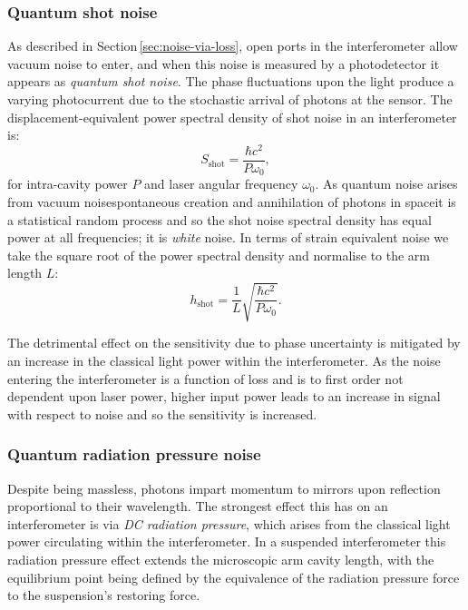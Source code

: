 \subsubsection{\label{sec:quantum-shot-noise}Quantum shot noise}
As described in Section\,\ref{sec:noise-via-loss}, open ports in the interferometer allow vacuum noise to enter, and when this noise is measured by a photodetector it appears as \emph{quantum shot noise}. The phase fluctuations upon the light produce a varying photocurrent due to the stochastic arrival of photons at the sensor. The displacement-equivalent power spectral density of shot noise in an interferometer is:
\begin{equation}
  \label{eq:shot-noise-psd}
  S_{\text{shot}} = \frac{\hbar c^2}{P \omega_0},
\end{equation}
for intra-cavity power $P$ and laser angular frequency $\omega_0$. As quantum noise arises from vacuum noise\textemdash spontaneous creation and annihilation of photons in space\textemdash it is a statistical random process and so the shot noise spectral density has equal power at all frequencies; it is \emph{white} noise. In terms of strain equivalent noise we take the square root of the power spectral density and normalise to the arm length $L$:
\begin{equation}
  h_{\text{shot}} = \frac{1}{L} \sqrt{\frac{\hbar c^2}{P \omega_0}}.
\end{equation}

The detrimental effect on the sensitivity due to phase uncertainty is mitigated by an increase in the classical light power within the interferometer. As the noise entering the interferometer is a function of loss and is to first order not dependent upon laser power, higher input power leads to an increase in signal with respect to noise and so the sensitivity is increased.

\subsubsection{\label{sec:quantum-rp-noise}Quantum radiation pressure noise}
Despite being massless, photons impart momentum to mirrors upon reflection proportional to their wavelength. The strongest effect this has on an interferometer is via \emph{\gls{DC} radiation pressure}, which arises from the classical light power circulating within the interferometer. In a suspended interferometer this radiation pressure effect extends the microscopic arm cavity length, with the equilibrium point being defined by the equivalence of the radiation pressure force to the suspension's restoring force.

